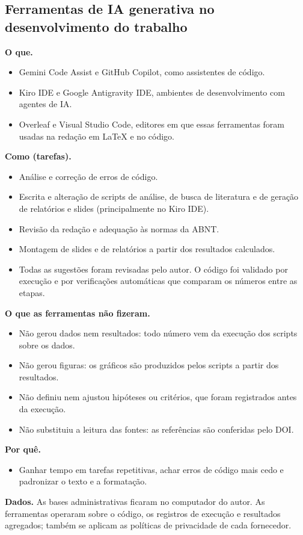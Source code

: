 \documentclass[12pt,a4paper]{article}
\begin{document}
\subsection{Ferramentas de IA generativa no desenvolvimento do trabalho}
\textbf{O que.}
\begin{itemize}
  \item Gemini Code Assist e GitHub Copilot, como assistentes de código.
  \item Kiro IDE e Google Antigravity IDE, ambientes de desenvolvimento com agentes de IA.
  \item Overleaf e Visual Studio Code, editores em que essas ferramentas foram usadas na redação em LaTeX e no código.
\end{itemize}
\textbf{Como (tarefas).}
\begin{itemize}
  \item Análise e correção de erros de código.
  \item Escrita e alteração de scripts de análise, de busca de literatura e de geração de relatórios e slides (principalmente no Kiro IDE).
  \item Revisão da redação e adequação às normas da ABNT.
  \item Montagem de slides e de relatórios a partir dos resultados calculados.
  \item Todas as sugestões foram revisadas pelo autor. O código foi validado por execução e por verificações automáticas que comparam os números entre as etapas.
\end{itemize}
\textbf{O que as ferramentas não fizeram.}
\begin{itemize}
  \item Não gerou dados nem resultados: todo número vem da execução dos scripts sobre os dados.
  \item Não gerou figuras: os gráficos são produzidos pelos scripts a partir dos resultados.
  \item Não definiu nem ajustou hipóteses ou critérios, que foram registrados antes da execução.
  \item Não substituiu a leitura das fontes: as referências são conferidas pelo DOI.
\end{itemize}
\textbf{Por quê.}
\begin{itemize}
  \item Ganhar tempo em tarefas repetitivas, achar erros de código mais cedo e padronizar o texto e a formatação.
\end{itemize}

\textbf{Dados.} As bases administrativas ficaram no computador do autor. As ferramentas operaram sobre o código, os registros de execução e resultados agregados; também se aplicam as políticas de privacidade de cada fornecedor.
\end{document}
